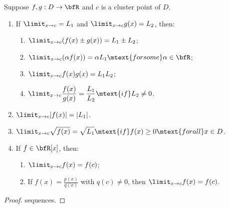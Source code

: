     \begin{theorem}
        Suppose $f,g:D \rightarrow \bfR$ and $c$ is a cluster point of $D$.
        \begin{enumerate}[label = (\arabic*)]
            \item If $\limit_{x \rightarrow c} = L_1$ and $\limit_{x \rightarrow c}g(x) = L_2$, then:
                \begin{enumerate}[label = (\roman*)]
                    \item $\displaystyle \limit_{x \rightarrow c}(f(x) \pm g(x)) = L_1 \pm L_2$;
                    \item $\displaystyle \limit_{x \rightarrow c}(\alpha f(x)) = \alpha L_1 \mtext{for some} \alpha \in \bfR$;
                    \item $\displaystyle \limit_{x \rightarrow c}f(x)g(x) = L_1 L_2$;
                    \item $\displaystyle \limit_{x \rightarrow c} \frac{f(x)}{g(x)} = \frac{L_1}{L_2} \mtext{if} L_2 \neq 0$.
                \end{enumerate}

            \item $\displaystyle \limit_{x \rightarrow c}|f(x)| = |L_1|$.
            \item $\displaystyle \limit_{x \rightarrow c}\sqrt{f(x)} = \sqrt{L_1} \mtext{if} f(x) \geq 0 \mtext{for all} x\in D$.
            \item If $f \in \bfR[x]$, then:
                \begin{enumerate}[label = (\arabic*)]
                    \item $\displaystyle \limit_{x \rightarrow c}f(x) = f(c)$;
                    \item If $f(x) = \frac{p(x)}{q(x)}$ with $q(c) \neq 0$, then $\displaystyle \limit_{x \rightarrow c}f(x) = f(c)$.
                \end{enumerate}
        \end{enumerate}
    \end{theorem}
        \begin{proof}
            {\color{red} sequences.}
        \end{proof}


